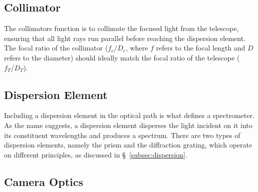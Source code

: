 \subsection{Collimator}

The collimators function is to collimate the focused light from the telescope, ensuring that all light rays run parallel before reaching the dispersion element. The focal ratio of the collimator ($f_{c} / D_{c}$, where $f$ refers to the focal length and $D$ refers to the diameter) should ideally match the focal ratio of the telescope ($f_{T} / D_{T}$).





\subsection{Dispersion Element}

Including a dispersion element in the optical path is what defines a spectrometer. As the name suggests, a dispersion element disperses the light incident on it into its constituent wavelengths and produces a spectrum. There are two types of dispersion elements, namely the prism and the diffraction grating, which operate on different principles, as discussed in \S~\ref{subsec:dispersion}.

\subsection{Camera Optics}

